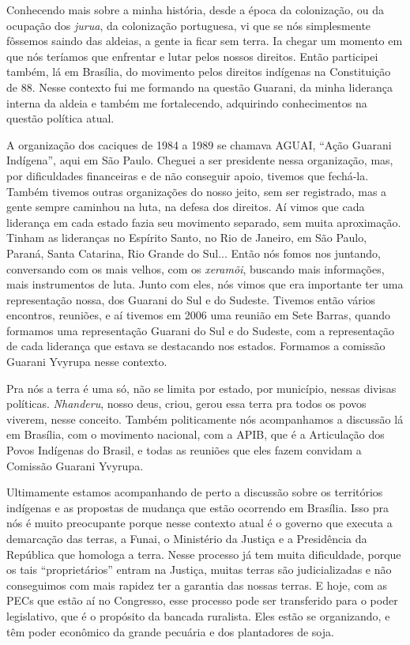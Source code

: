 Conhecendo mais sobre a minha história, desde a época da colonização, ou
da ocupação dos \emph{jurua}, da colonização portuguesa, vi que se nós
simplesmente fôssemos saindo das aldeias, a gente ia ficar sem terra. Ia
chegar um momento em que nós teríamos que enfrentar e lutar pelos nossos
direitos. Então participei também, lá em Brasília, do movimento pelos
direitos indígenas na Constituição de 88. Nesse contexto fui me formando
na questão Guarani, da minha liderança interna da aldeia e também me
fortalecendo, adquirindo conhecimentos na questão política atual.

A organização dos caciques de 1984 a 1989 se chamava AGUAI, ``Ação
Guarani Indígena'', aqui em São Paulo. Cheguei a ser presidente nessa
organização, mas, por dificuldades financeiras e de não conseguir apoio,
tivemos que fechá-la. Também tivemos outras organizações do nosso jeito,
sem ser registrado, mas a gente sempre caminhou na luta, na defesa dos
direitos. Aí vimos que cada liderança em cada estado fazia seu movimento
separado, sem muita aproximação. Tinham as lideranças no Espírito Santo,
no Rio de Janeiro, em São Paulo, Paraná, Santa Catarina, Rio Grande do
Sul... Então nós fomos nos juntando, conversando com os mais velhos, com
os \emph{xeramõi}, buscando mais informações, mais instrumentos de luta.
Junto com eles, nós vimos que era importante ter uma representação
nossa, dos Guarani do Sul e do Sudeste. Tivemos então vários encontros,
reuniões, e aí tivemos em 2006 uma reunião em Sete Barras, quando
formamos uma representação Guarani do Sul e do Sudeste, com a
representação de cada liderança que estava se destacando nos estados.
Formamos a comissão Guarani Yvyrupa nesse contexto.

Pra nós a terra é uma só, não se limita por estado, por município,
nessas divisas políticas. \emph{Nhanderu}, nosso deus, criou, gerou essa
terra pra todos os povos viverem, nesse conceito. Também politicamente
nós acompanhamos a discussão lá em Brasília, com o movimento nacional,
com a APIB, que é a Articulação dos Povos Indígenas do Brasil, e todas
as reuniões que eles fazem convidam a Comissão Guarani Yvyrupa.

Ultimamente estamos acompanhando de perto a discussão sobre os
territórios indígenas e as propostas de mudança que estão ocorrendo em
Brasília. Isso pra nós é muito preocupante porque nesse contexto atual é
o governo que executa a demarcação das terras, a Funai, o Ministério da
Justiça e a Presidência da República que homologa a terra. Nesse
processo já tem muita dificuldade, porque os tais ``proprietários''
entram na Justiça, muitas terras são judicializadas e não conseguimos
com mais rapidez ter a garantia das nossas terras. E hoje, com as PECs
que estão aí no Congresso, esse processo pode ser transferido para o
poder legislativo, que é o propósito da bancada ruralista. Eles estão se
organizando, e têm poder econômico da grande pecuária e dos plantadores
de soja.

